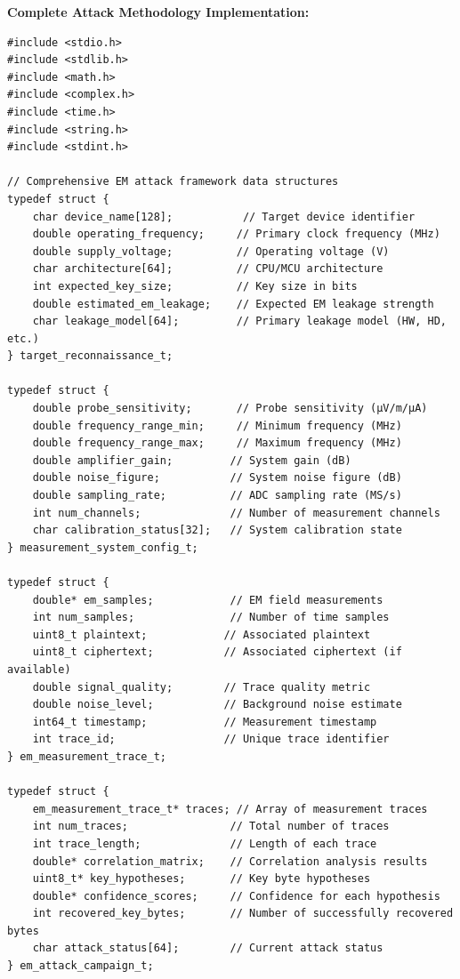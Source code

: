 \documentclass[11pt,a4paper]{article}
\theoremstyle{definition}
\begin{document}
\textbf{Complete Attack Methodology Implementation:}

\begin{lstlisting}[caption={Complete EM Attack Methodology Framework Implementation}]
#include <stdio.h>
#include <stdlib.h>
#include <math.h>
#include <complex.h>
#include <time.h>
#include <string.h>
#include <stdint.h>

// Comprehensive EM attack framework data structures
typedef struct {
    char device_name[128];           // Target device identifier
    double operating_frequency;     // Primary clock frequency (MHz)
    double supply_voltage;          // Operating voltage (V)
    char architecture[64];          // CPU/MCU architecture
    int expected_key_size;          // Key size in bits
    double estimated_em_leakage;    // Expected EM leakage strength
    char leakage_model[64];         // Primary leakage model (HW, HD, etc.)
} target_reconnaissance_t;

typedef struct {
    double probe_sensitivity;       // Probe sensitivity (μV/m/μA)
    double frequency_range_min;     // Minimum frequency (MHz)
    double frequency_range_max;     // Maximum frequency (MHz)
    double amplifier_gain;         // System gain (dB)
    double noise_figure;           // System noise figure (dB)
    double sampling_rate;          // ADC sampling rate (MS/s)
    int num_channels;              // Number of measurement channels
    char calibration_status[32];   // System calibration state
} measurement_system_config_t;

typedef struct {
    double* em_samples;            // EM field measurements
    int num_samples;               // Number of time samples
    uint8_t plaintext;            // Associated plaintext
    uint8_t ciphertext;           // Associated ciphertext (if available)
    double signal_quality;        // Trace quality metric
    double noise_level;           // Background noise estimate
    int64_t timestamp;            // Measurement timestamp
    int trace_id;                 // Unique trace identifier
} em_measurement_trace_t;

typedef struct {
    em_measurement_trace_t* traces; // Array of measurement traces
    int num_traces;                // Total number of traces
    int trace_length;              // Length of each trace
    double* correlation_matrix;    // Correlation analysis results
    uint8_t* key_hypotheses;       // Key byte hypotheses
    double* confidence_scores;     // Confidence for each hypothesis
    int recovered_key_bytes;       // Number of successfully recovered bytes
    char attack_status[64];        // Current attack status
} em_attack_campaign_t;


\end{lstlisting}
\end{document}
